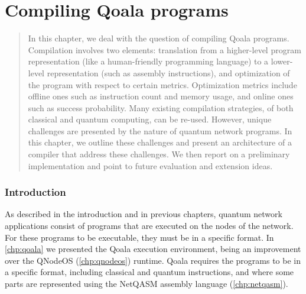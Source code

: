 \chapter
 [Compiling Qoala programs]
 {Compiling Qoala programs}
\label{chp:compiler}


\begin{abstract}
In this chapter, we deal with the question of compiling Qoala programs.
Compilation involves two elements: translation from a higher-level program representation (like a human-friendly programming language) to 
a lower-level representation (such as assembly instructions), and optimization of the program with respect to certain metrics.
Optimization metrics include offline ones such as instruction count and memory usage, and online ones such as success probability.
Many existing compilation strategies, of both classical and quantum computing, can be re-used.
However, unique challenges are presented by the nature of quantum network programs.
In this chapter, we outline these challenges and present an architecture of a compiler that address these challenges.
We then report on a preliminary implementation and point to future evaluation and extension ideas.
\end{abstract}

\subsection{Introduction}
As described in the introduction and in previous chapters, quantum network applications consist of programs that are executed on the nodes of the network.
For these programs to be executable, they must be in a specific format.
In \cref{chp:qoala} we presented the Qoala execution environment, being an improvement over the QNodeOS (\cref{chp:qnodeos}) runtime.
Qoala requires the programs to be in a specific format, including classical and quantum instructions, and where some parts are represented using the NetQASM assembly language (\cref{chp:netqasm}).

